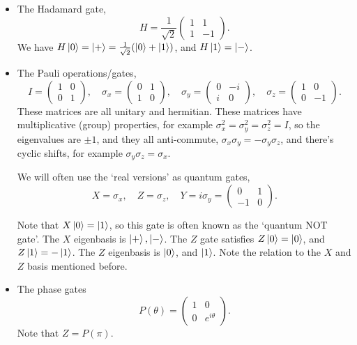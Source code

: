 \documentclass[a4paper]{article}
\begin{document}
\begin{itemize}
	\item The Hadamard gate, 
	$$H = \frac{1}{\sqrt{2}}\begin{pmatrix}
		1 & 1 \\
		1 & -1
	\end{pmatrix}.$$
	We have $H\ket{0} = \ket{+} = \frac{1}{\sqrt{2}}(\ket{0} + \ket{1})$, and $H\ket{1} = \ket{-}$.
	
	\item The Pauli operations/gates,
	$$
	I = \begin{pmatrix}
		1 & 0 \\ 0 & 1
	\end{pmatrix}, \quad \sigma_x = \begin{pmatrix}
		0 & 1 \\ 1 & 0
	\end{pmatrix}, \quad \sigma_y = \begin{pmatrix}
		0 & -i \\ i & 0
	\end{pmatrix}, \quad \sigma_z = \begin{pmatrix}
		1 & 0 \\0 & -1
	\end{pmatrix}.
	$$
	These matrices are all unitary and hermitian. These matrices have multiplicative (group) properties, for example $\sigma_x^2 = \sigma_y^2 = \sigma_z^2 = I$, so the eigenvalues are $\pm 1$, and they all anti-commute, $\sigma_x \sigma_y = - \sigma_y \sigma_z$, and there's cyclic shifts, for example $\sigma_y \sigma_z = \sigma_x$.

	We will often use the `real versions' as quantum gates,
	$$
	X = \sigma_x, \quad Z = \sigma_z, \quad Y = i \sigma_y = \begin{pmatrix}
		0 & 1 \\
		-1 & 0
	\end{pmatrix}.
	$$

	Note that $X\ket{0} = \ket{1}$, so this gate is often known as the `quantum NOT gate'. The $X$ eigenbasis is $\ket{+}, \ket{-}$. The $Z$ gate satisfies $Z \ket{0} = \ket{0}$, and $Z\ket{1} = - \ket{1}$. The $Z$ eigenbasis is $\ket{0}$, and $\ket{1}$. Note the relation to the $X$ and $Z$ basis mentioned before.

	\item The phase gates
	$$
	P(\theta) = \begin{pmatrix}
		1 & 0 \\
		0 & e^{i \theta}
	\end{pmatrix}.
	$$
	Note that $Z = P(\pi)$.
\end{itemize}
\end{document}
